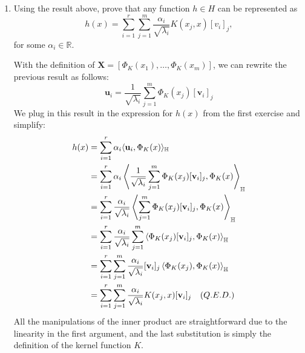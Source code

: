 \documentclass{article}
\def\Rset{\mathbb{R}}
\begin{document}
\begin{enumerate}
\item Using the result above, prove that any function $h \in H$ can be represented as
\begin{equation*}
h(x) = \sum^{r}_{i=1} \sum^{m}_{j = 1}\frac{\alpha_{i}}{\sqrt{\lambda_{i}}} K(x_{j},x)[v_{i}]_{j},
\end{equation*}
for some $\alpha_{i} \in \Rset$.

With the definition of $\mathbf{X} = [\Phi_{K}(x_{1}),\dots,\Phi_{K}(x_{m})]$, we can rewrite the previous result as follows:
\begin{equation*}
    \mathbf{u}_i = \frac{1}{\sqrt{\lambda_{i}}}\sum^{m}_{j = 1}\Phi_{K}(x_{j})[\mathbf{v}_i]_j
\end{equation*}
We plug in this result in the expression for $h(x)$ from the first exercise and simplify:
\begin{align*}
    h(x) &= \sum_{i=1}^{r} \alpha_{i} \langle \mathbf{u}_i , \Phi_{K}(x)\rangle_{\mathbb{H}}\\
    &= \sum_{i=1}^{r} \alpha_{i} \left\langle \frac{1}{\sqrt{\lambda_{i}}}\sum^{m}_{j = 1}\Phi_{K}(x_{j})[\mathbf{v}_i]_j , \Phi_{K}(x)\right\rangle_{\mathbb{H}}\\
    &= \sum_{i=1}^{r} \frac{\alpha_{i}}{\sqrt{\lambda_{i}}} \left\langle \sum^{m}_{j = 1}\Phi_{K}(x_{j})[\mathbf{v}_i]_j , \Phi_{K}(x)\right\rangle_{\mathbb{H}}\\
    &= \sum_{i=1}^{r} \frac{\alpha_{i}}{\sqrt{\lambda_{i}}} \sum^{m}_{j = 1} \left\langle \Phi_{K}(x_{j})[\mathbf{v}_i]_j , \Phi_{K}(x)\right\rangle_{\mathbb{H}}\\
    &= \sum_{i=1}^{r} \sum^{m}_{j = 1} \frac{\alpha_{i}}{\sqrt{\lambda_{i}}} [\mathbf{v}_i]_j \left\langle \Phi_{K}(x_{j}), \Phi_{K}(x)\right\rangle_{\mathbb{H}}\\
    &= \sum_{i=1}^{r} \sum^{m}_{j = 1} \frac{\alpha_{i}}{\sqrt{\lambda_{i}}} K(x_j,x)[\mathbf{v}_i]_j \textit \quad {(Q.E.D.)}
\end{align*}
All the manipulations of the inner product are straightforward due to the linearity in the first argument, and the last substitution is simply the definition of the kernel function $K$.


\end{enumerate}
\end{document}
